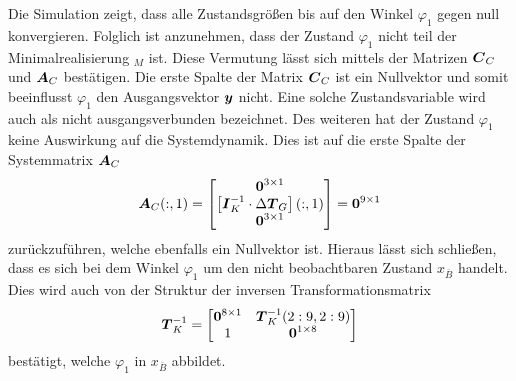 \pagebreak
Die Simulation zeigt, dass alle Zustandsgrößen bis auf den Winkel $\varphi_1$ gegen null konvergieren. Folglich ist anzunehmen, dass der Zustand $\varphi_1$ nicht teil der Minimalrealisierung $_M$ ist. Diese Vermutung lässt sich mittels der Matrizen $\boldsymbol{C}_C$ und $\boldsymbol{A}_C$ bestätigen. Die erste Spalte der Matrix $\boldsymbol{C}_C$ ist ein Nullvektor und somit beeinflusst $\varphi_1$ den Ausgangsvektor $\boldsymbol{y}$ nicht. Eine solche Zustandsvariable wird auch als nicht ausgangsverbunden bezeichnet. Des weiteren hat der Zustand $\varphi_1$ keine Auswirkung auf die Systemdynamik. Dies ist auf die erste Spalte der Systemmatrix $\boldsymbol{A}_C$
\begin{equation}
\boldsymbol{A}_C(:,1) = \begin{bmatrix}
\boldsymbol{0}^{3\times 1} \\ \left[\boldsymbol{I}^{-1}_K\cdot \Delta\boldsymbol{T}_G\right](:,1)\\ \boldsymbol{0}^{3\times 1}
\end{bmatrix} = \boldsymbol{0}^{9\times 1}
\end{equation}
zurückzuführen, welche ebenfalls ein Nullvektor ist. Hieraus lässt sich schließen, dass es sich bei dem Winkel $\varphi_1$ um den nicht beobachtbaren Zustand $x_{\overline{B}}$ handelt. Dies wird auch von der Struktur der inversen Transformationsmatrix
\begin{equation}
\boldsymbol{T}^{-1}_K = \begin{bmatrix}
\boldsymbol{0}^{8\times 1} & \boldsymbol{T}^{-1}_K(2:9,2:9) \\
1 & \boldsymbol{0}^{1\times 8}
\end{bmatrix}
\end{equation}
bestätigt, welche $\varphi_1$ in $x_{\overline{B}}$ abbildet.

